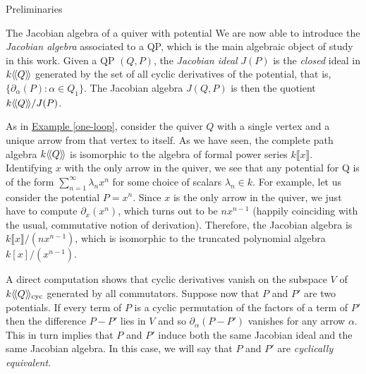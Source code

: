 \begin{chapter}{Preliminaries}
\begin{section}{The Jacobian algebra of a quiver with potential}
We are now able to introduce the \emph{Jacobian algebra} associated to a QP, which is the main algebraic object of study in this work. Given a QP $(Q,P)$, the \emph{Jacobian ideal} $J(P)$ is the \emph{closed} ideal in $k\langle\!\langle Q\rangle\!\rangle$ generated by the set of all cyclic derivatives of the potential, that is, $\{\partial_\alpha(P) : \alpha\in Q_1\}$. The Jacobian algebra $J(Q,P)$ is then the quotient $k\langle\!\langle Q\rangle\!\rangle/J(P)$.

\begin{exmp} As in \hyperref[one-loop]{Example \ref*{one-loop}}, consider the quiver $Q$ with a single vertex and a unique arrow from that vertex to itself. As we have seen, the complete path algebra $k\langle\!\langle Q\rangle\!\rangle$ is isomorphic to the algebra of formal power series $k\llbracket x\rrbracket$. Identifying $x$ with the only arrow in the quiver, we see that any potential for Q is of the form $\sum_{n=1}^\infty \lambda_n x^n$ for some choice of scalars $\lambda_n\in k$. For example, let us consider the potential $P=x^n$. Since $x$ is the only arrow in the quiver, we just have to compute $\partial_x(x^n)$, which turns out to be $nx^{n-1}$ (happily coinciding with the usual, commutative notion of derivation). Therefore, the Jacobian algebra is $k\llbracket x\rrbracket/(nx^{n-1})$, which is isomorphic to the truncated polynomial algebra $k[x]/(x^{n-1})$.
\end{exmp}

A direct computation shows that cyclic derivatives vanish on the subspace $V$ of $k\langle\!\langle Q\rangle\!\rangle_{\mathrm{cyc}}$ generated by all commutators. Suppose now that $P$ and $P'$ are two potentials. If every term of $P$ is a cyclic permutation of the factors of a term of $P'$ then the difference $P-P'$ lies in $V$ and so $\partial_\alpha(P-P')$ vanishes for any arrow $\alpha$. This in turn implies that $P$ and $P'$ induce both the same Jacobian ideal and the same Jacobian algebra. In this case, we will say that $P$ and $P'$ are \emph{cyclically equivalent}.


\end{section}
\end{chapter}
